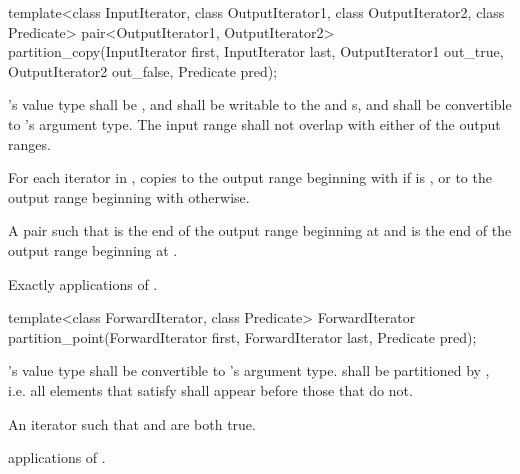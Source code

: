 %
\begin{itemdecl}
template<class InputIterator, class OutputIterator1,
          class OutputIterator2, class Predicate>
  pair<OutputIterator1, OutputIterator2>
  partition_copy(InputIterator first, InputIterator last,
                 OutputIterator1 out_true, OutputIterator2 out_false,
                 Predicate pred);
\end{itemdecl}


\begin{itemdescr}
\pnum
\requires {}'s value type shall be , and shall be
writable to the  and  s, and shall be
convertible to 's argument type. The input range shall not overlap with
either of the output ranges.

\pnum
\effects For each iterator  in , copies  to the output range beginning with  if  is , or to the output range beginning with  otherwise.

\pnum
\returns A pair  such that  is the end of the output range beginning at  and  is the end of the output range beginning at .

\pnum
\complexity Exactly  applications of .
\end{itemdescr}

%
\begin{itemdecl}
template<class ForwardIterator, class Predicate>
  ForwardIterator partition_point(ForwardIterator first,
                                  ForwardIterator last,
                                  Predicate pred);
\end{itemdecl}


\begin{itemdescr}
\pnum
\requires {}'s value type shall be convertible to 's argument type.  shall be partitioned by , i.e. all elements that satisfy  shall appear before those that do not.

\pnum
\returns An iterator  such that  and  are both true.

\pnum
\complexity {} applications of .
\end{itemdescr}


